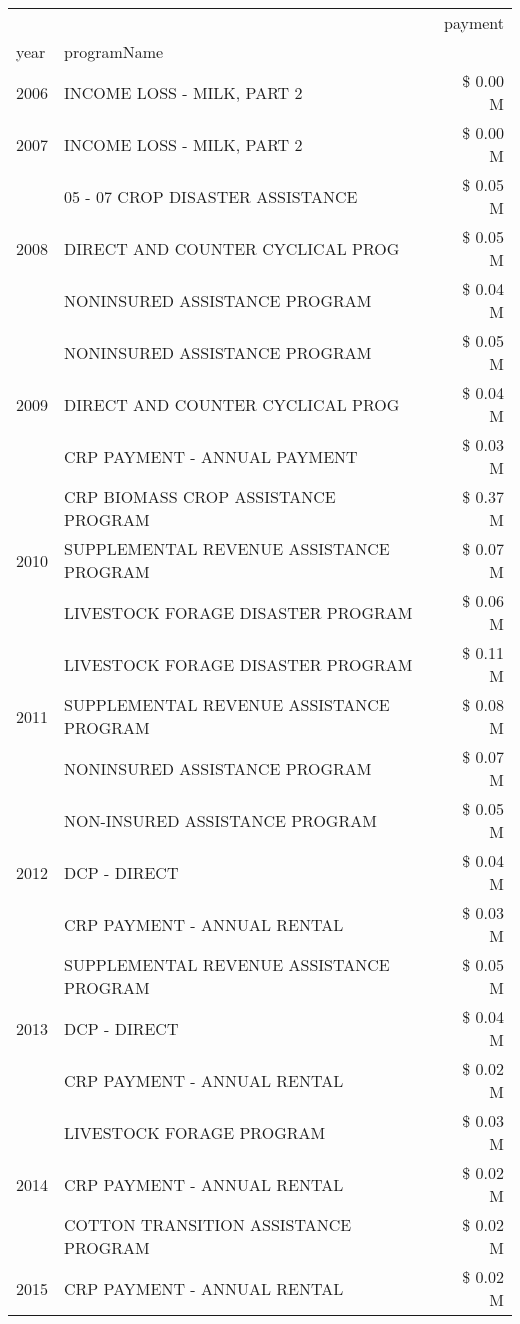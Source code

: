 \begin{tabular}{llr}
\toprule
 &  & payment \\
year & programName &  \\
\midrule
2006 & INCOME LOSS - MILK, PART 2 & \$ 0.00 M \\
\cline{1-3}
2007 & INCOME LOSS - MILK, PART 2 & \$ 0.00 M \\
\cline{1-3}
\multirow[t]{3}{*}{2008} & 05 - 07 CROP DISASTER ASSISTANCE & \$ 0.05 M \\
 & DIRECT AND COUNTER CYCLICAL PROG & \$ 0.05 M \\
 & NONINSURED ASSISTANCE PROGRAM & \$ 0.04 M \\
\cline{1-3}
\multirow[t]{3}{*}{2009} & NONINSURED ASSISTANCE PROGRAM & \$ 0.05 M \\
 & DIRECT AND COUNTER CYCLICAL PROG & \$ 0.04 M \\
 & CRP PAYMENT - ANNUAL PAYMENT & \$ 0.03 M \\
\cline{1-3}
\multirow[t]{3}{*}{2010} & CRP BIOMASS CROP ASSISTANCE PROGRAM & \$ 0.37 M \\
 & SUPPLEMENTAL REVENUE ASSISTANCE PROGRAM & \$ 0.07 M \\
 & LIVESTOCK FORAGE DISASTER PROGRAM & \$ 0.06 M \\
\cline{1-3}
\multirow[t]{3}{*}{2011} & LIVESTOCK FORAGE DISASTER PROGRAM & \$ 0.11 M \\
 & SUPPLEMENTAL REVENUE ASSISTANCE PROGRAM & \$ 0.08 M \\
 & NONINSURED ASSISTANCE PROGRAM & \$ 0.07 M \\
\cline{1-3}
\multirow[t]{3}{*}{2012} & NON-INSURED ASSISTANCE PROGRAM & \$ 0.05 M \\
 & DCP - DIRECT & \$ 0.04 M \\
 & CRP PAYMENT - ANNUAL RENTAL & \$ 0.03 M \\
\cline{1-3}
\multirow[t]{3}{*}{2013} & SUPPLEMENTAL REVENUE ASSISTANCE PROGRAM & \$ 0.05 M \\
 & DCP - DIRECT & \$ 0.04 M \\
 & CRP PAYMENT - ANNUAL RENTAL & \$ 0.02 M \\
\cline{1-3}
\multirow[t]{3}{*}{2014} & LIVESTOCK FORAGE PROGRAM & \$ 0.03 M \\
 & CRP PAYMENT - ANNUAL RENTAL & \$ 0.02 M \\
 & COTTON TRANSITION ASSISTANCE PROGRAM & \$ 0.02 M \\
\cline{1-3}
\multirow[t]{3}{*}{2015} & CRP PAYMENT - ANNUAL RENTAL & \$ 0.02 M \\

\end{tabular}
